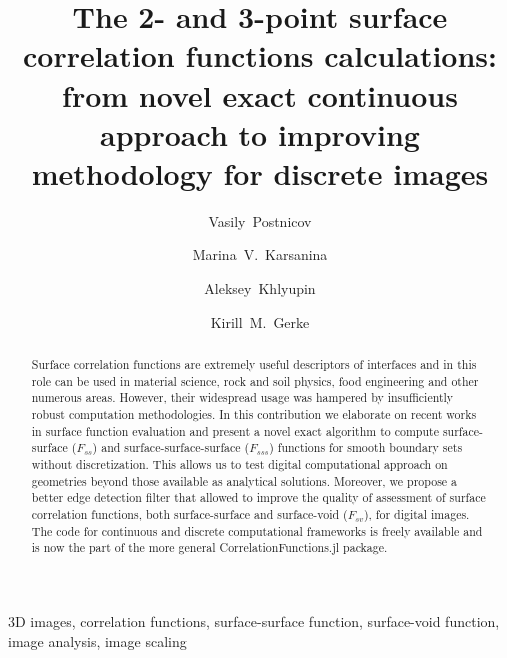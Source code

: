\documentclass[1p]{elsarticle}
\begin{document}
\author[Smith]{Vasily~Postnicov}
\author[Smith]{Marina~V.~Karsanina}
\author[Smith,MIT]{Aleksey~Khlyupin}
\author[Smith]{Kirill~M.~Gerke}

\address[Smith]{Schmidt Institute of Physics of the Earth of Russian Academy of
  Sciences, Moscow, 107031, Russia}
\address[MIT]{Moscow Institute of Physics and Technology,
  Dolgoprudny, 141701, Russia}

\title{The 2- and 3-point surface correlation functions calculations: from novel
  exact continuous approach to improving methodology for discrete images}

\begin{abstract}
  Surface correlation functions are extremely useful descriptors of interfaces
  and in this role can be used in material science, rock and soil physics, food
  engineering and other numerous areas. However, their widespread usage was
  hampered by insufficiently robust computation methodologies. In this
  contribution we elaborate on recent works in surface function evaluation and
  present a novel exact algorithm to compute surface-surface ($F_{ss}$) and
  surface-surface-surface ($F_{sss}$) functions for smooth boundary sets without
  discretization. This allows us to test digital computational approach on
  geometries beyond those available as analytical solutions. Moreover, we
  propose a better edge detection filter that allowed to improve the quality of
  assessment of surface correlation functions, both surface-surface and
  surface-void ($F_{sv}$), for digital images. The code for continuous and
  discrete computational frameworks is freely available and is now the part of
  the more general CorrelationFunctions.jl package.
\end{abstract}

\begin{keyword}
  3D images, correlation functions, surface-surface function, surface-void
  function, image analysis, image scaling
\end{keyword}

\maketitle
\end{document}
